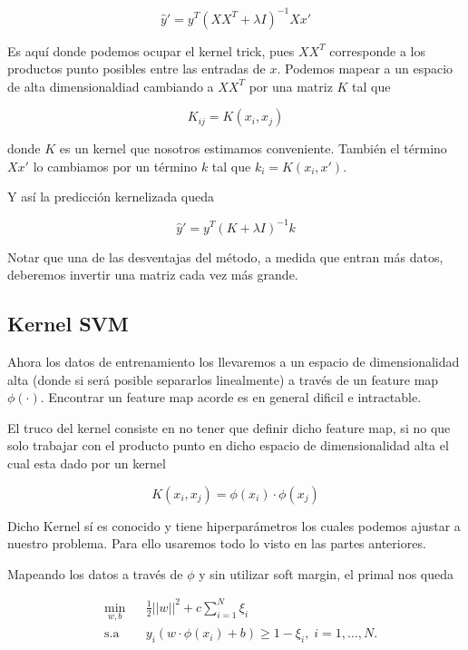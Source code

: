 $$\hat{y}' = y^T (XX^T + \lambda I)^{-1} X x'$$


Es aquí donde podemos ocupar el kernel trick, pues $XX^T $ corresponde a los productos punto posibles entre las entradas de $x$. Podemos mapear a un espacio de alta dimensionaldiad cambiando a $XX^T$ por una matriz $K$ tal que

$$K_{ij} = K(x_i, x_j)$$

donde $K$ es un kernel que nosotros estimamos conveniente. También el término $X x' $ lo cambiamos por un término $k$ tal que $k_i = K(x_i , x')$.

Y así la predicción kernelizada queda

$$\hat{y}' = y^T (K + \lambda I)^{-1} k$$

Notar que una de las desventajas del método, a medida que entran más datos, deberemos invertir una matriz cada vez más grande. 

\subsection{Kernel SVM}



Ahora los datos de entrenamiento los llevaremos a un espacio de dimensionalidad alta (donde si será posible separarlos linealmente) a través de un feature map $\phi(\cdot)$. Encontrar un feature map acorde es en general dificil e intractable. 

El truco del kernel consiste en no tener que definir dicho feature map, si no que solo trabajar con el producto punto en dicho espacio de dimensionalidad alta el cual esta dado por un kernel 

$$K(x_i, x_j) = \phi(x_i) \cdot \phi(x_j)$$

Dicho Kernel sí es conocido y tiene hiperparámetros los cuales podemos ajustar a nuestro problema. Para ello usaremos todo lo visto en las partes anteriores.

Mapeando los datos a través de $\phi$ y sin utilizar soft margin, el primal nos queda

\begin{equation*}
\begin{aligned}
& \underset{w,b}{\text{min}}
& & \frac{1}{2}||w||^2 + c\sum\limits_{i=1}^{N} \xi_i\\
& \text{s.a}
& & y_i (w\cdot \phi(x_i) +b) \geq 1- \xi_i, \; i = 1, \ldots, N.
\end{aligned}
\end{equation*}

